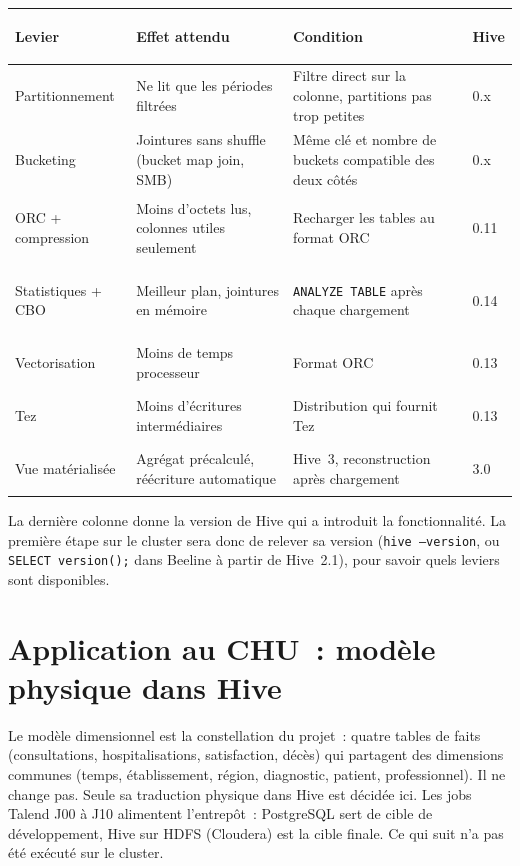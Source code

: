 \begin{center}
\small
\begin{tabularx}{\textwidth}{>{\bfseries\raggedright\arraybackslash}p{3.1cm} >{\raggedright\arraybackslash}X >{\raggedright\arraybackslash}X l}
\toprule
Levier & Effet attendu & Condition & Hive \\
\midrule
Partitionnement & Ne lit que les périodes filtrées & Filtre direct sur la colonne, partitions pas trop petites & 0.x \\
Bucketing & Jointures sans shuffle (bucket map join, SMB) & Même clé et nombre de buckets compatible des deux côtés & 0.x \\
ORC + compression & Moins d'octets lus, colonnes utiles seulement & Recharger les tables au format ORC & 0.11 \\
Statistiques + CBO & Meilleur plan, jointures en mémoire & \texttt{ANALYZE TABLE} après chaque chargement & 0.14 \\
Vectorisation & Moins de temps processeur & Format ORC & 0.13 \\
Tez & Moins d'écritures intermédiaires & Distribution qui fournit Tez & 0.13 \\
Vue matérialisée & Agrégat précalculé, réécriture automatique & Hive~3, reconstruction après chargement & 3.0 \\
\bottomrule
\end{tabularx}
\end{center}

\noindent La dernière colonne donne la version de Hive qui a introduit la fonctionnalité. La première étape sur le cluster sera donc de relever sa version (\texttt{hive --version}, ou \texttt{SELECT version();} dans Beeline à partir de Hive~2.1), pour savoir quels leviers sont disponibles.

\newpage
\section{Application au CHU~: modèle physique dans Hive}

\noindent Le modèle dimensionnel est la constellation du projet~: quatre tables de faits (consultations, hospitalisations, satisfaction, décès) qui partagent des dimensions communes (temps, établissement, région, diagnostic, patient, professionnel). Il ne change pas. Seule sa traduction physique dans Hive est décidée ici. Les jobs Talend J00 à J10 alimentent l'entrepôt~: PostgreSQL sert de cible de développement, Hive sur HDFS (Cloudera) est la cible finale. Ce qui suit n'a pas été exécuté sur le cluster.

